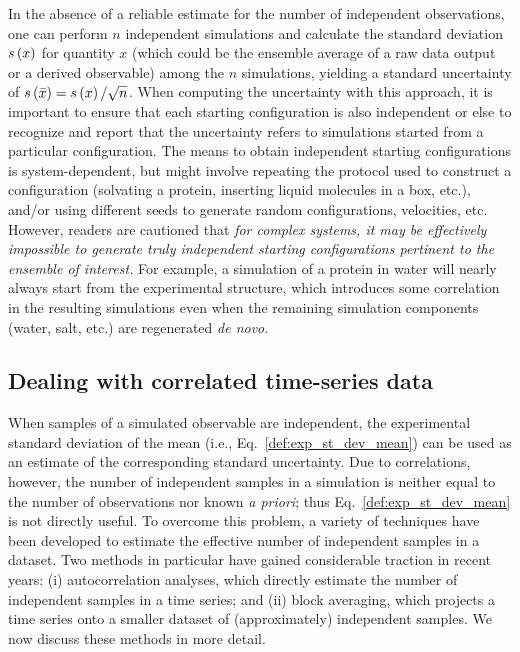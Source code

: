 In the absence of a reliable estimate for the number of independent observations, one can perform $n$ independent simulations and calculate the standard deviation $s\left( x \right)$ for quantity $x$ (which could be the ensemble average of a raw data output or a derived observable) among the $n$ simulations, yielding a standard uncertainty of $s\left( \bar{x} \right) = s\left( x \right) / \sqrt{n}$.  When computing the uncertainty with this approach, it is important to ensure that each starting configuration is also independent or else to recognize and report that the uncertainty refers to simulations started from a particular configuration.  The means to obtain independent starting configurations is system-dependent, but might involve repeating the protocol used to construct a configuration (solvating a protein, inserting liquid molecules in a box, etc.), and/or using different seeds to generate random configurations, velocities, etc.  However, readers are cautioned that \emph{for complex systems, it may be effectively impossible to generate truly independent starting configurations pertinent to the ensemble of interest.}  For example, a simulation of a protein in water will nearly always start from the experimental structure, which introduces some correlation in the resulting simulations even when the remaining simulation components (water, salt, etc.) are regenerated {\it de novo}.  

\subsection{Dealing with correlated time-series data}

When samples of a simulated observable are independent, the experimental standard deviation of the mean (i.e.,  Eq.~\hyperref[def:exp_st_dev]{\ref{def:exp_st_dev_mean}}) can be used as an estimate of the corresponding standard uncertainty.  Due to correlations, however, the number of independent samples in a simulation is neither equal to the number of observations nor known {\it a priori}; thus Eq.~\ref{def:exp_st_dev_mean} is not directly useful.  To overcome this problem, a variety of techniques have been developed to estimate the effective number of independent samples in a dataset.  Two methods in particular have gained considerable traction in recent years:  (i) autocorrelation analyses, which directly estimate the number of independent samples in a time series; and (ii) block averaging, which projects a time series onto a smaller dataset of (approximately) independent samples.  We now discuss these methods in more detail.


